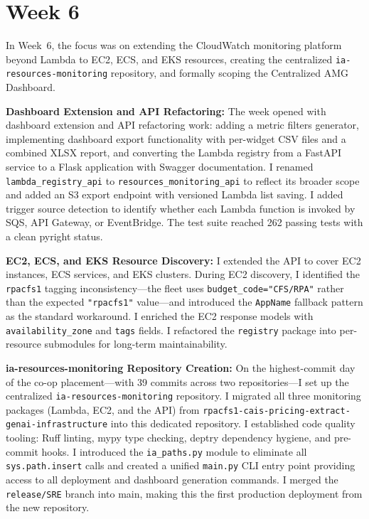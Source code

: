\section{Week 6}
\label{sec:week6}

In Week~6, the focus was on extending the CloudWatch monitoring platform
beyond Lambda to EC2, ECS, and EKS resources, creating the centralized
\texttt{ia-resources-monitoring} repository, and formally scoping
the Centralized AMG Dashboard.

\textbf{Dashboard Extension and API Refactoring:} 
The week
opened with dashboard extension and API refactoring work: adding a metric filters generator, implementing
dashboard export functionality with per-widget CSV files and a combined
XLSX report, and converting the Lambda registry from a FastAPI service
to a Flask application with Swagger documentation. I renamed
\texttt{lambda\_registry\_api} to \texttt{resources\_monitoring\_api}
to reflect its broader scope and added an S3 export endpoint with
versioned Lambda list saving. I added trigger source detection to identify
whether each Lambda function is invoked by SQS, API Gateway, or EventBridge. The test suite reached 262 passing tests with a clean
pyright status.

\textbf{EC2, ECS, and EKS Resource Discovery:} 
I extended the API to cover EC2 instances, ECS services, and EKS
clusters. During EC2 discovery, I identified the \texttt{rpacfs1} tagging
inconsistency---the fleet uses \texttt{budget\_code="CFS/RPA"} rather than
the expected \texttt{"rpacfs1"} value---and introduced the
\texttt{AppName} fallback pattern as the standard workaround. I enriched the EC2 response models with \texttt{availability\_zone} and \texttt{tags}
fields. I refactored the \texttt{registry} package into per-resource
submodules for long-term maintainability.

\textbf{ia-resources-monitoring Repository Creation:} 
On the highest-commit day of the co-op placement---with 39 commits
across two repositories---I set up the centralized \texttt{ia-resources-monitoring}
repository. I migrated all three monitoring packages (Lambda, EC2, and the API)
from \texttt{rpacfs1-cais-pricing-\allowbreak{}extract-genai-infrastructure}
into this dedicated repository. I established code quality tooling:
Ruff linting, mypy type checking, deptry dependency hygiene, and
pre-commit hooks. I introduced the \texttt{ia\_paths.py} module to
eliminate all \texttt{sys.path.insert} calls and created a unified
\texttt{main.py} CLI entry point providing access to all deployment
and dashboard generation commands. I merged the \texttt{release/SRE} branch
into main, making this the first production deployment
from the new repository.

